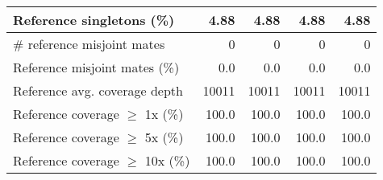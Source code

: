 \documentclass[12pt,a4paper]{article}
\begin{document}
\begin{table}[ht]
\begin{center}
\begin{tabular}{|l*{4}{|r}|}
Reference singletons (\%) & 4.88 & 4.88 & 4.88 & 4.88 \\ \hline
\# reference misjoint mates & 0 & 0 & 0 & 0 \\ \hline
Reference misjoint mates (\%) & 0.0 & 0.0 & 0.0 & 0.0 \\ \hline
Reference avg. coverage depth & 10011 & 10011 & 10011 & 10011 \\ \hline
Reference coverage $\geq$ 1x (\%) & 100.0 & 100.0 & 100.0 & 100.0 \\ \hline
Reference coverage $\geq$ 5x (\%) & 100.0 & 100.0 & 100.0 & 100.0 \\ \hline
Reference coverage $\geq$ 10x (\%) & 100.0 & 100.0 & 100.0 & 100.0 \\ \hline
\end{tabular}
\end{center}
\end{table}
\end{document}
